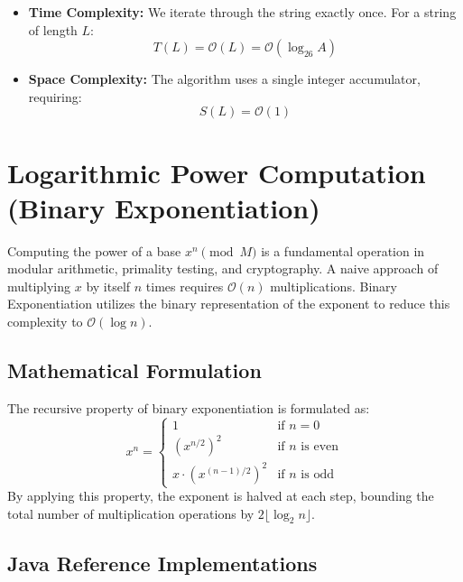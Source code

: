 \documentclass[10pt,journal,compsoc,onecolumn]{IEEEtran}
\begin{document}
\begin{itemize}
    \item \textbf{Time Complexity:} We iterate through the string exactly once. For a string of length $L$:
    \begin{equation}
    T(L) = \mathcal{O}(L) = \mathcal{O}(\log_{26} A)
    \end{equation}
    \item \textbf{Space Complexity:} The algorithm uses a single integer accumulator, requiring:
    \begin{equation}
    S(L) = \mathcal{O}(1)
    \end{equation}
\end{itemize}

\section{Logarithmic Power Computation (Binary Exponentiation)}
\label{sec:pow}

Computing the power of a base $x^n \pmod M$ is a fundamental operation in modular arithmetic, primality testing, and cryptography. A naive approach of multiplying $x$ by itself $n$ times requires $\mathcal{O}(n)$ multiplications. Binary Exponentiation utilizes the binary representation of the exponent to reduce this complexity to $\mathcal{O}(\log n)$.

\subsection{Mathematical Formulation}

The recursive property of binary exponentiation is formulated as:
\begin{equation}
x^n = \begin{cases} 
1 & \text{if } n = 0 \\
\left(x^{n/2}\right)^2 & \text{if } n \text{ is even} \\
x \cdot \left(x^{(n-1)/2}\right)^2 & \text{if } n \text{ is odd} 
\end{cases}
\end{equation}
By applying this property, the exponent is halved at each step, bounding the total number of multiplication operations by $2 \lfloor \log_2 n \rfloor$.

\subsection{Java Reference Implementations}
\end{document}
